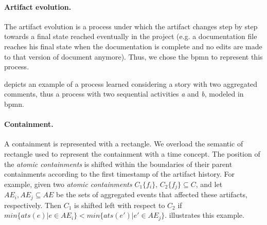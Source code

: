 \paragraph{Artifact evolution.}

The artifact evolution is a process under which the artifact changes step by step towards a final state reached eventually in the project (e.g. a documentation file reaches his final state when the documentation is complete and no edits are made to that version of document anymore). Thus, we chose the \gls{bpmn} to represent this process. 

 depicts an example of a process learned considering a story with two aggregated comments, thus a process with two sequential activities \emph{a} and \emph{b}, modeled in \gls{bpmn}. 

%


\paragraph{Containment.} 
A containment is represented with a rectangle. 
We overload the semantic of rectangle used to represent the containment with a time concept. The position of the \emph{atomic containments} is shifted within the boundaries of their parent containments according to the first timestamp of the artifact history. For example, given two \emph{atomic containments} $C_1\{f_i\}$, $C_2\{f_j\} \subseteq C$, and let $AE_i, AE_j \subseteq AE$ be the sets of aggregated events that affected these artifacts, respectively. Then $C_1$ is shifted left with respect to $C_2$ if $min\{ats(e) | e \in AE_i\} < min\{ats(e') | e' \in AE_j\}$.  illustrates this example.

